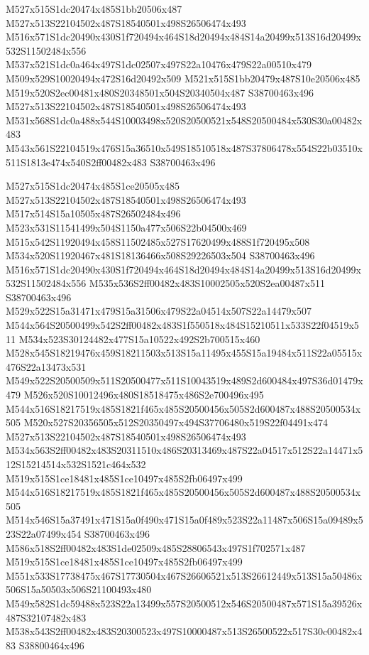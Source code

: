 \documentclass{article}
\begin{document}
\begin{multicols}{2}
M527x515S1dc20474x485S1bb20506x487 M527x513S22104502x487S18540501x498S26506474x493 M516x571S1dc20490x430S1f720494x464S18d20494x484S14a20499x513S16d20499x532S11502484x556 M537x521S1dc0a464x497S1dc02507x497S22a10476x479S22a00510x479 M509x529S10020494x472S16d20492x509 M521x515S1bb20479x487S10e20506x485 M519x520S2ec00481x480S20348501x504S20340504x487 S38700463x496 M527x513S22104502x487S18540501x498S26506474x493 M531x568S1dc0a488x544S10003498x520S20500521x548S20500484x530S30a00482x483 M543x561S22104519x476S15a36510x549S18510518x487S37806478x554S22b03510x511S1813e474x540S2ff00482x483 S38700463x496

M527x515S1dc20474x485S1ce20505x485 M527x513S22104502x487S18540501x498S26506474x493 M517x514S15a10505x487S26502484x496 M523x531S11541499x504S1150a477x506S22b04500x469 M515x542S11920494x458S11502485x527S17620499x488S1f720495x508 M534x520S11920467x481S18136466x508S29226503x504 S38700463x496 M516x571S1dc20490x430S1f720494x464S18d20494x484S14a20499x513S16d20499x532S11502484x556 M535x536S2ff00482x483S10002505x520S2ea00487x511 S38700463x496 M529x522S15a31471x479S15a31506x479S22a04514x507S22a14479x507 M544x564S20500499x542S2ff00482x483S1f550518x484S15210511x533S22f04519x511 M534x523S30124482x477S15a10522x492S2b700515x460 M528x545S18219476x459S18211503x513S15a11495x455S15a19484x511S22a05515x476S22a13473x531 M549x522S20500509x511S20500477x511S10043519x489S2d600484x497S36d01479x479 M526x520S10012496x480S18518475x486S2e700496x495 M544x516S18217519x485S1821f465x485S20500456x505S2d600487x488S20500534x505 M520x527S20356505x512S20350497x494S37706480x519S22f04491x474 M527x513S22104502x487S18540501x498S26506474x493 M534x563S2ff00482x483S20311510x486S20313469x487S22a04517x512S22a14471x512S15214514x532S1521c464x532 M519x515S1ce18481x485S1ce10497x485S2fb06497x499 M544x516S18217519x485S1821f465x485S20500456x505S2d600487x488S20500534x505 M514x546S15a37491x471S15a0f490x471S15a0f489x523S22a11487x506S15a09489x523S22a07499x454 S38700463x496 M586x518S2ff00482x483S1de02509x485S28806543x497S1f702571x487 M519x515S1ce18481x485S1ce10497x485S2fb06497x499 M551x533S17738475x467S17730504x467S26606521x513S26612449x513S15a50486x506S15a50503x506S21100493x480 M549x582S1dc59488x523S22a13499x557S20500512x546S20500487x571S15a39526x487S32107482x483 M538x543S2ff00482x483S20300523x497S10000487x513S26500522x517S30c00482x483 S38800464x496


\end{multicols}
\end{document}
